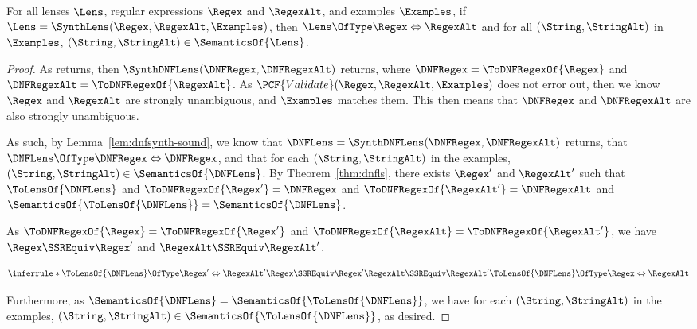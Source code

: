 \documentclass[acmsmall,screen]{acmart}
\begin{document}
\begin{theorem}
  For all lenses $\Lens$, regular expressions $\Regex$ and $\RegexAlt$, and
  examples $\Examples$, 
  if \\$\Lens = \SynthLens(\Regex,\RegexAlt,\Examples)$, then
  $\Lens \OfType \Regex \Leftrightarrow \RegexAlt$ and for all
  $(\String,\StringAlt)$ in $\Examples$, $(\String,\StringAlt) \in
  \SemanticsOf{\Lens}$.
\end{theorem}
\begin{proof}
  As \SynthLens{} returns, then $\SynthDNFLens(\DNFRegex,\DNFRegexAlt)$ returns,
  where $\DNFRegex = \ToDNFRegexOf{\Regex}$ and $\DNFRegexAlt =
  \ToDNFRegexOf{\RegexAlt}$.  As $\PCF{Validate}(\Regex,\RegexAlt,\Examples)$
  does not error out, then we know $\Regex$ and $\RegexAlt$ are strongly
  unambiguous, and $\Examples$ matches them.  This then means that $\DNFRegex$
  and $\DNFRegexAlt$ are also strongly unambiguous.

  As such, by Lemma~\ref{lem:dnfsynth-sound}, we know that $\DNFLens =
  \SynthDNFLens(\DNFRegex,\DNFRegexAlt)$ returns, that $\DNFLens \OfType
  \DNFRegex \Leftrightarrow \DNFRegex$, and that for each $(\String,\StringAlt)$
  in the examples, $(\String,\StringAlt) \in \SemanticsOf{\DNFLens}$.  By Theorem~\ref{thm:dnfls}, there
  exists $\Regex'$ and $\RegexAlt'$ such that $\ToLensOf{\DNFLens}$ and
  $\ToDNFRegexOf{\Regex'} = \DNFRegex$ and $\ToDNFRegexOf{\RegexAlt'} =
  \DNFRegexAlt$ and $\SemanticsOf{\ToLensOf{\DNFLens}} =
  \SemanticsOf{\DNFLens}$.

  As $\ToDNFRegexOf{\Regex} = \ToDNFRegexOf{\Regex'}$ and
  $\ToDNFRegexOf{\RegexAlt} = \ToDNFRegexOf{\RegexAlt'}$, we have
  $\Regex \SSREquiv \Regex'$ and $\RegexAlt \SSREquiv \RegexAlt'$.

  \[
    \inferrule*
    {
      \ToLensOf{\DNFLens} \OfType \Regex' \Leftrightarrow \RegexAlt'\\
      \Regex \SSREquiv \Regex'\\
      \RegexAlt \SSREquiv \RegexAlt'\\
    }
    {
      \ToLensOf{\DNFLens} \OfType \Regex \Leftrightarrow \RegexAlt
    }
  \]

  Furthermore, as $\SemanticsOf{\DNFLens} = \SemanticsOf{\ToLensOf{\DNFLens}}$,
  we have for each $(\String,\StringAlt)$ in the examples, $(\String,\StringAlt)
  \in \SemanticsOf{\ToLensOf{\DNFLens}}$, as desired.
\end{proof}
\end{document}
